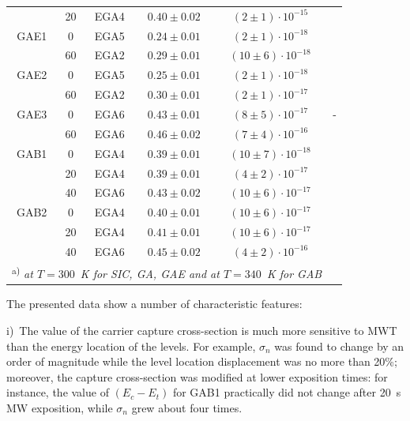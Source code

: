 \documentclass[%
 aip,jap,
 amsmath,amssymb,
 reprint,%
]{revtex4-1}
\begin{document}
\begin{table}
\begin{ruledtabular}
\begin{tabular}{ccccccc}
& 20 &EGA4& $0.40\pm0.02$ &$(2\pm1)\cdot10^{-15}$&\multicolumn{2}{c}{}\\ %
GAE1& 0 &EGA5& $0.24\pm0.01$ &$(2\pm1)\cdot10^{-18}$&\multicolumn{2}{c}{}\\ %
& 60 &EGA2& $0.29\pm0.01$ &$(10\pm6)\cdot10^{-18}$&\multicolumn{2}{c}{}\\ %
GAE2& 0 &EGA5& $0.25\pm0.01$ &$(2\pm1)\cdot10^{-18}$&\multicolumn{2}{c}{}\\ %
& 60 &EGA2& $0.30\pm0.01$ &$(2\pm1)\cdot10^{-17}$&\multicolumn{2}{c}{}\\ %
GAE3& 0 &EGA6& $0.43\pm0.01$ &$(8\pm5)\cdot10^{-17}$&\multicolumn{2}{c}{-}\\ %
& 60 &EGA6& $0.46\pm0.02$ &$(7\pm4)\cdot10^{-16}$&\multicolumn{2}{c}{}\\ %
GAB1& 0 &EGA4& $0.39\pm0.01$ &$(10\pm7)\cdot10^{-18}$&\multicolumn{2}{c}{}\\ %
& 20 &EGA4& $0.39\pm0.01$ &$(4\pm2)\cdot10^{-17}$&\multicolumn{2}{c}{}\\ %
& 40 &EGA6& $0.43\pm0.02$ &$(10\pm6)\cdot10^{-17}$&\multicolumn{2}{c}{}\\ %
GAB2& 0 &EGA4& $0.40\pm0.01$ &$(10\pm6)\cdot10^{-17}$&\multicolumn{2}{c}{}\\ %
& 20 &EGA4& $0.41\pm0.01$ &$(10\pm6)\cdot10^{-17}$&\multicolumn{2}{c}{}\\ %
& 40 &EGA6& $0.45\pm0.02$ &$(4\pm2)\cdot10^{-16}$&\multicolumn{2}{c}{}\\  %
\multicolumn{6}{l}{\textsuperscript{ a)} \emph{at $T=300$~K for SIC, GA, GAE and at $T=340$~K for GAB}}\\
\end{tabular}
\end{ruledtabular}
\end{table}

The presented data show a number of characteristic features:

\noindent
i)~The value of the carrier capture cross-section is much more sensitive to MWT than the energy location of the levels.
For example, $\sigma_n$ was found to change by an order of magnitude while the level location displacement was no more than 20\%;
moreover, the capture cross-section was modified at lower exposition times:
for instance, the value of $(E_c-E_t)$ for GAB1 practically did not change after 20~s MW exposition, while $\sigma_n$ grew about four times.
\end{document}
